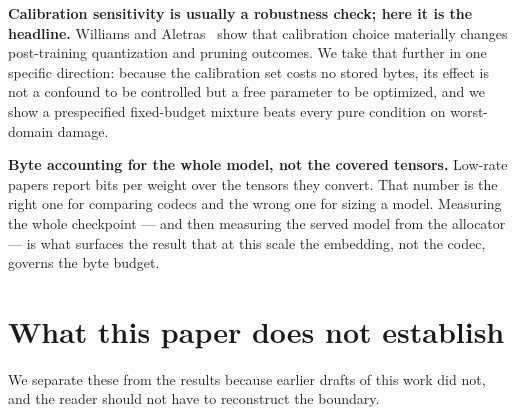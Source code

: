 \documentclass[11pt]{article}
\begin{document}
\textbf{Calibration sensitivity is usually a robustness check; here it is the
headline.} Williams and Aletras~\cite{calibdata} show that calibration choice
materially changes post-training quantization and pruning outcomes. We take that
further in one specific direction: because the calibration set costs no stored
bytes, its effect is not a confound to be controlled but a free parameter to be
optimized, and we show a prespecified fixed-budget mixture beats every pure
condition on worst-domain damage.

\textbf{Byte accounting for the whole model, not the covered tensors.} Low-rate
papers report bits per weight over the tensors they convert. That number is the
right one for comparing codecs and the wrong one for sizing a model. Measuring
the whole checkpoint --- and then measuring the served model from the
allocator --- is what surfaces the result that at this scale the embedding, not
the codec, governs the byte budget.

\section{What this paper does not establish}

We separate these from the results because earlier drafts of this work did not,
and the reader should not have to reconstruct the boundary.
\end{document}
